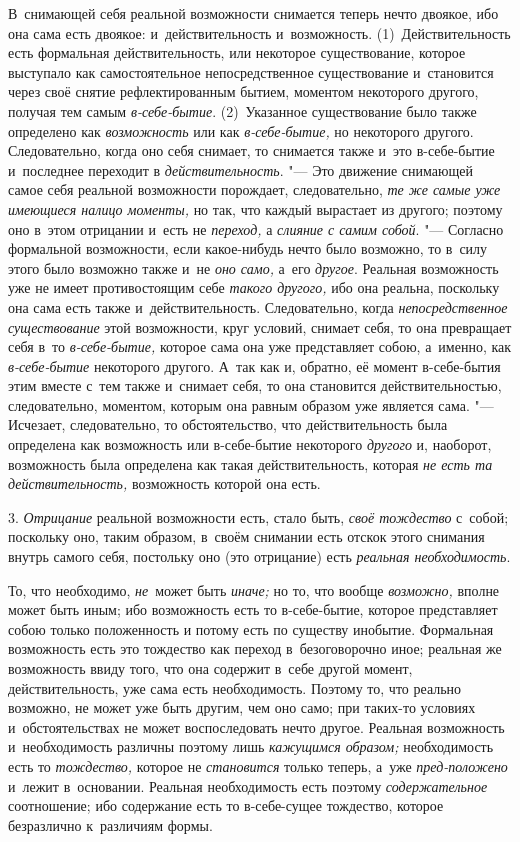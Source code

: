 В~снимающей себя реальной возможности снимается теперь нечто двоякое, ибо
она сама есть двоякое: и~действительность и~возможность.
(1)~Действительность есть формальная действительность, или некоторое
существование, которое выступало как самостоятельное непосредственное
существование и~становится через своё снятие рефлектированным бытием,
моментом некоторого другого, получая тем самым
{\em в-себе-бытие}. (2)~Указанное существование было
также определено как {\em возможность} или как
{\em в-себе-бытие,} но некоторого другого.
Следовательно, когда оно себя снимает, то снимается также и~это
в-себе-бытие и~последнее переходит в
{\em действительность}. "--- Это движение снимающей самое
себя реальной возможности порождает, следовательно,
{\em те же самые уже имеющиеся налицо моменты,} но так,
что каждый вырастает из другого; поэтому оно в~этом отрицании и~есть не
{\em переход,} а {\em слияние с
самим собой}. "--- Согласно формальной возможности, если какое-нибудь нечто
было возможно, то в~силу этого было возможно также и~не
{\em оно само,} а~его {\em другое}.
Реальная возможность уже не имеет противостоящим себе
{\em такого другого,} ибо она реальна, поскольку она
сама есть также и~действительность. Следовательно, когда
{\em непосредственное существование} этой возможности,
круг условий, снимает себя, то она превращает себя в~то
{\em в-себе-бытие,} которое сама она уже представляет
собою, а~именно, как {\em в-себе-бытие} некоторого
другого. А~так как и, обратно, её момент в-себе-бытия этим вместе с~тем
также и~снимает себя, то она становится действительностью, следовательно,
моментом, которым она равным образом уже является сама. "--- Исчезает,
следовательно, то обстоятельство, что действительность была определена как
возможность или в-себе-бытие некоторого {\em другого}
и, наоборот, возможность была определена как такая действительность,
которая {\em не есть та действительность,} возможность
которой она есть.

3. {\em Отрицание} реальной возможности есть, стало
быть, {\em своё тождество} с~собой; поскольку оно,
таким образом, в~своём снимании есть отскок этого снимания внутрь самого
себя, постольку оно (это отрицание) есть {\em реальная
необходимость}.

То, что необходимо, {\em не}~может быть {\em иначе;} но то, что вообще
{\em возможно,} вполне может быть иным; ибо возможность
есть то в-себе-бытие, которое представляет собою только положенность и
потому есть по существу инобытие. Формальная возможность есть это тождество
как переход в~безоговорочно иное; реальная же возможность ввиду того, что
она содержит в~себе другой момент, действительность, уже сама есть
необходимость. Поэтому то, что реально возможно, не может уже быть другим,
чем оно само; при таких-то условиях и~обстоятельствах не может
воспоследовать нечто другое. Реальная возможность и~необходимость различны
поэтому лишь {\em кажущимся образом;} необходимость есть то {\em тождество,}
которое не {\em становится} только теперь, а~уже {\em пред-положено} и~лежит
в~основании. Реальная необходимость есть поэтому {\em содержательное}
соотношение; ибо содержание есть то в-себе-сущее тождество, которое
безразлично к~различиям формы.

